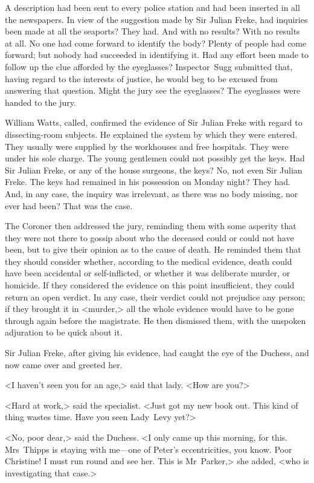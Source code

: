 A description had been sent to every police station and had been inserted in all the newspapers. In view of the suggestion made by Sir Julian Freke, had inquiries been made at all the seaports? They had. And with no results? With no results at all. No one had come forward to identify the body? Plenty of people had come forward; but nobody had succeeded in identifying it. Had any effort been made to follow up the clue afforded by the eyeglasses? Inspector~Sugg submitted that, having regard to the interests of justice, he would beg to be excused from answering that question. Might the jury see the eyeglasses? The eyeglasses were handed to the jury.

William Watts, called, confirmed the evidence of Sir Julian Freke with regard to dissecting-room subjects. He explained the system by which they were entered. They usually were supplied by the workhouses and free hospitals. They were under his sole charge. The young gentlemen could not possibly get the keys. Had Sir Julian Freke, or any of the house surgeons, the keys? No, not even Sir Julian Freke. The keys had remained in his possession on Monday night? They had. And, in any case, the inquiry was irrelevant, as there was no body missing, nor ever had been? That was the case.

The Coroner then addressed the jury, reminding them with some asperity that they were not there to gossip about who the deceased could or could not have been, but to give their opinion as to the cause of death. He reminded them that they should consider whether, according to the medical evidence, death could have been accidental or self-inflicted, or whether it was deliberate murder, or homicide. If they considered the evidence on this point insufficient, they could return an open verdict. In any case, their verdict could not prejudice any person; if they brought it in <murder,> all the whole evidence would have to be gone through again before the magistrate. He then dismissed them, with the unspoken adjuration to be quick about it.

Sir Julian Freke, after giving his evidence, had caught the eye of the Duchess, and now came over and greeted her.

<I haven't seen you for an age,> said that lady. <How are you?>

<Hard at work,> said the specialist. <Just got my new book out. This kind of thing wastes time. Have you seen Lady~Levy yet?>

<No, poor dear,> said the Duchess. <I only came up this morning, for this. Mrs~Thipps is staying with me—one of Peter's eccentricities, you know. Poor Christine! I must run round and see her. This is Mr~Parker,> she added, <who is investigating that case.>

